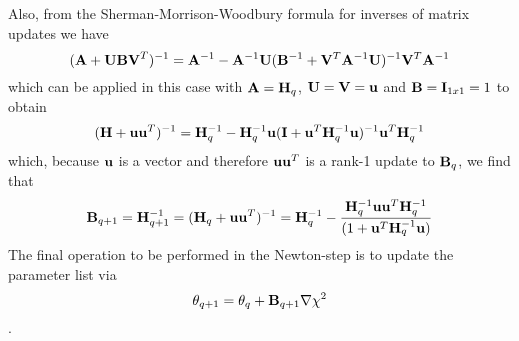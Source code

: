 Also, from the Sherman-Morrison-Woodbury formula for inverses of matrix updates we have
$$({\bf A} + {\bf UBV}^T)^{-1} = {\bf A}^{-1} - {\bf A}^{-1}{\bf U}({\bf B}^{-1} + {\bf V}^T{\bf A}^{-1}{\bf U})^{-1}{\bf V}^T{\bf A}^{-1}$$which can be applied in this case with ${\bf A} = {\bf H}_q$, ${\bf U} = {\bf V} = {\bf u}$ and 
${\bf B} = {\bf I}_{1x1} = 1 $ to obtain $$({\bf H} + {\bf uu}^T)^{-1} = {\bf H}_q^{-1} - {\bf H}_q^{-1}{\bf u}({\bf I} + {\bf u}^T{\bf H}_q^{-1}{\bf u})^{-1}{\bf u}^T{\bf H}_q^{-1}$$which, because ${\bf u}$ is a vector and therefore ${\bf uu}^T$ is a rank-1 update to ${\bf B}_q$, we 
find that $${\bf B}_{q+1} = {\bf H}_{q+1}^{-1} = ({\bf H}_q + {\bf uu}^T)^{-1} = {\bf H}_q^{-1} - {{\bf H}_q^{-1}{\bf uu}^T{\bf H}_q^{-1}\over ( 1 + {\bf u}^T{\bf H}_q^{-1}{\bf u})}$$The final operation to be performed in the Newton-step is to update the parameter list via $$\theta_{q+1} = \theta_q +  {\bf B}_{q+1} {\bf \nabla} \chi^2$$.



